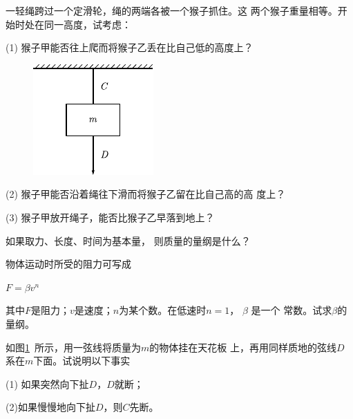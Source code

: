 \begin{questions}
\question 一轻绳跨过一个定滑轮，绳的两端各被一个猴子抓住。这
两个猴子重量相等。开始时处在同一高度，试考虑：

(1) 猴子甲能否往上爬而将猴子乙丢在比自己低的高度上？

\begin{figure}
    \centering
    \includegraphics{figure/fig03.21}
    \caption{}
    \label{fig:03.21}
\end{figure}
(2) 猴子甲能否沿着绳往下滑而将猴子乙留在比自己高的高
度上？

(3) 猴子甲放开绳子，能否比猴子乙早落到地上？

\question 如果取力、长度、时间为基本量，
则质量的量纲是什么？

\question 物体运动时所受的阻力可写成

\noindent\mbox{}\hspace{6em} $F = \beta v ^ n$

其中$ F $是阻力；$ v $是速度；$ n $为某个数。在低速时$  n = 1  $， $ \beta $  是一个
常数。试求$ \beta $的量纲。

\question 如图\ref{fig:03.21}~所示，用一弦线将质量为$ m $的物体挂在天花板
上，再用同样质地的弦线$ D $系在$ m $下面。试说明以下事实

(1) 如果突然向下扯$ D $，$ D $就断；

(2)如果慢慢地向下扯$ D $，则$ C $先断。
\end{questions}




